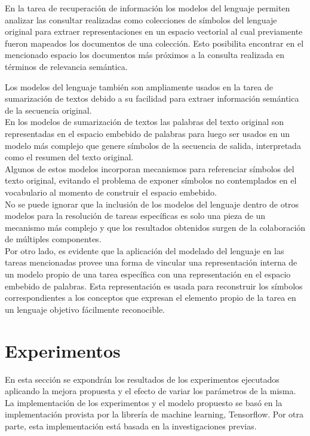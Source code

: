 \documentclass{article}
\begin{document}
	En la tarea de recuperación de información los modelos del lenguaje permiten analizar las consultar realizadas como colecciones de símbolos del lenguaje original para extraer representaciones en un espacio vectorial al cual previamente fueron mapeados los documentos de una colección\cite{58WordEmbeddingInformationRetrieval}. Esto posibilita encontrar en el mencionado espacio los documentos más próximos a la consulta realizada en términos de relevancia semántica\cite{59RelevanceWordEmbeddings}.
	
	Los modelos del lenguaje también son ampliamente usados en la tarea de sumarización de textos debido a su facilidad para extraer información semántica de la secuencia original.\\
	En los modelos de sumarización de textos las palabras del texto original son representadas en el espacio embebido de palabras para luego ser usados en un modelo más complejo que genere símbolos de la secuencia de salida, interpretada como el resumen del texto original\cite{64WordEmbeddingTextSumarization}.\\
	Algunos de estos modelos incorporan mecanismos para referenciar símbolos del texto original, evitando el problema de exponer símbolos no contemplados en el vocabulario al momento de construir el espacio embebido\cite{65WordEmbeddingTextSumarizationPointingBack}.\\
	
	No se puede ignorar que la inclusión de los modelos del lenguaje dentro de otros modelos para la resolución de tareas específicas es solo una pieza de un mecanismo más complejo y que los resultados obtenidos surgen de la colaboración de múltiples componentes.\\
	Por otro lado, es evidente que la aplicación del modelado del lenguaje en las tareas mencionadas provee una forma de vincular una representación interna de un modelo propio de una tarea específica con una representación en el espacio embebido de palabras. Esta representación es usada para reconstruir los símbolos correspondientes a los conceptos que expresan el elemento propio de la tarea en un lenguaje objetivo fácilmente reconocible.
	
	\pagebreak
	
	\section{Experimentos}\label{sectionExperiments}
	En esta sección se expondrán los resultados de los experimentos ejecutados aplicando la mejora propuesta y el efecto de variar los parámetros de la misma.\\
	La implementación de los experimentos y el modelo propuesto se basó en la implementación provista por la librería de machine learning, Tensorflow. Por otra parte, esta implementación está basada en la investigaciones previas\cite{14RegularizationZaremba}.\\
	
\end{document}
